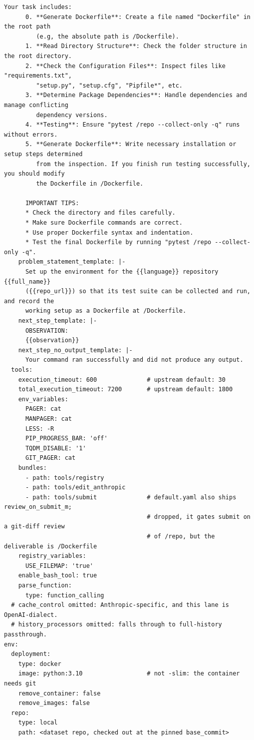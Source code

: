 \begin{lstlisting}[style=promptstyle]
      Your task includes:
      0. **Generate Dockerfile**: Create a file named "Dockerfile" in the root path
         (e.g, the absolute path is /Dockerfile).
      1. **Read Directory Structure**: Check the folder structure in the root directory.
      2. **Check the Configuration Files**: Inspect files like "requirements.txt",
         "setup.py", "setup.cfg", "Pipfile*", etc.
      3. **Determine Package Dependencies**: Handle dependencies and manage conflicting
         dependency versions.
      4. **Testing**: Ensure "pytest /repo --collect-only -q" runs without errors.
      5. **Generate Dockerfile**: Write necessary installation or setup steps determined
         from the inspection. If you finish run testing successfully, you should modify
         the Dockerfile in /Dockerfile.

      IMPORTANT TIPS:
      * Check the directory and files carefully.
      * Make sure Dockerfile commands are correct.
      * Use proper Dockerfile syntax and indentation.
      * Test the final Dockerfile by running "pytest /repo --collect-only -q".
    problem_statement_template: |-
      Set up the environment for the {{language}} repository {{full_name}}
      ({{repo_url}}) so that its test suite can be collected and run, and record the
      working setup as a Dockerfile at /Dockerfile.
    next_step_template: |-
      OBSERVATION:
      {{observation}}
    next_step_no_output_template: |-
      Your command ran successfully and did not produce any output.
  tools:
    execution_timeout: 600              # upstream default: 30
    total_execution_timeout: 7200       # upstream default: 1800
    env_variables:
      PAGER: cat
      MANPAGER: cat
      LESS: -R
      PIP_PROGRESS_BAR: 'off'
      TQDM_DISABLE: '1'
      GIT_PAGER: cat
    bundles:
      - path: tools/registry
      - path: tools/edit_anthropic
      - path: tools/submit              # default.yaml also ships review_on_submit_m;
                                        # dropped, it gates submit on a git-diff review
                                        # of /repo, but the deliverable is /Dockerfile
    registry_variables:
      USE_FILEMAP: 'true'
    enable_bash_tool: true
    parse_function:
      type: function_calling
  # cache_control omitted: Anthropic-specific, and this lane is OpenAI-dialect.
  # history_processors omitted: falls through to full-history passthrough.
env:
  deployment:
    type: docker
    image: python:3.10                  # not -slim: the container needs git
    remove_container: false
    remove_images: false
  repo:
    type: local
    path: <dataset repo, checked out at the pinned base_commit>
\end{lstlisting}

